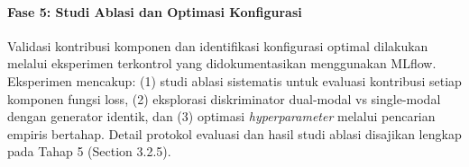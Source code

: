 \documentclass[12pt,a4paper]{article}
\begin{document}
% 

\paragraph{Fase 5: Studi Ablasi dan Optimasi Konfigurasi}
Validasi kontribusi komponen dan identifikasi konfigurasi optimal dilakukan melalui eksperimen terkontrol yang didokumentasikan menggunakan MLflow. Eksperimen mencakup: (1) studi ablasi sistematis untuk evaluasi kontribusi setiap komponen fungsi loss, (2) eksplorasi diskriminator dual-modal vs single-modal dengan generator identik, dan (3) optimasi \textit{hyperparameter} melalui pencarian empiris bertahap. Detail protokol evaluasi dan hasil studi ablasi disajikan lengkap pada Tahap 5 (Section 3.2.5).
\end{document}
